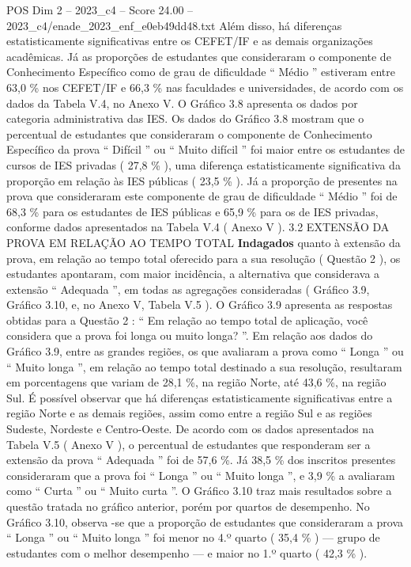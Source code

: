 \begin{textsample}{POS Dim 2 – 2023\_c4 – Score 24.00 – 2023\_c4/enade\_2023\_enf\_e0eb49dd48.txt}
Além disso, há diferenças estatisticamente significativas entre os CEFET/IF e as demais organizações acadêmicas.
Já as proporções de estudantes que consideraram o componente de Conhecimento Específico como de grau de dificuldade “ Médio ” estiveram entre 63,0 \% nos CEFET/IF e 66,3 \% nas faculdades e universidades, de acordo com os dados da Tabela V.4, no Anexo V.
O Gráfico 3.8 apresenta os dados por categoria administrativa das IES.
Os dados do Gráfico 3.8 mostram que o percentual de estudantes que consideraram o componente de Conhecimento Específico da prova “ Difícil ” ou “ Muito difícil ” foi maior entre os estudantes de cursos de IES privadas ( 27,8 \% ), uma diferença estatisticamente significativa da proporção em relação às IES públicas ( 23,5 \% ).
Já a proporção de presentes na prova que consideraram este componente de grau de dificuldade “ Médio ” foi de 68,3 \% para os estudantes de IES públicas e 65,9 \% para os de IES privadas, conforme dados apresentados na Tabela V.4 ( Anexo V ). 3.2 EXTENSÃO DA PROVA EM RELAÇÃO AO TEMPO TOTAL \textbf{Indagados} quanto à extensão da prova, em relação ao tempo total oferecido para a sua resolução ( Questão 2 ), os estudantes apontaram, com maior incidência, a alternativa que considerava a extensão “ Adequada ”, em todas as agregações consideradas ( Gráfico 3.9, Gráfico 3.10, e, no Anexo V, Tabela V.5 ).
O Gráfico 3.9 apresenta as respostas obtidas para a Questão 2 : “ Em relação ao tempo total de aplicação, você considera que a prova foi longa ou muito longa? ”.
Em relação aos dados do Gráfico 3.9, entre as grandes regiões, os que avaliaram a prova como “ Longa ” ou “ Muito longa ”, em relação ao tempo total destinado a sua resolução, resultaram em porcentagens que variam de 28,1 \%, na região Norte, até 43,6 \%, na região Sul.
É possível observar que há diferenças estatisticamente significativas entre a região Norte e as demais regiões, assim como entre a região Sul e as regiões Sudeste, Nordeste e Centro-Oeste.
De acordo com os dados apresentados na Tabela V.5 ( Anexo V ), o percentual de estudantes que responderam ser a extensão da prova “ Adequada ” foi de 57,6 \%.
Já 38,5 \% dos inscritos presentes consideraram que a prova foi “ Longa ” ou “ Muito longa ”, e 3,9 \% a avaliaram como “ Curta ” ou “ Muito curta ”.
O Gráfico 3.10 traz mais resultados sobre a questão tratada no gráfico anterior, porém por quartos de desempenho.
No Gráfico 3.10, observa -se que a proporção de estudantes que consideraram a prova “ Longa ” ou “ Muito longa ” foi menor no 4.º quarto ( 35,4 \% ) — grupo de estudantes com o melhor desempenho — e maior no 1.º quarto ( 42,3 \% ).

\end{textsample}
